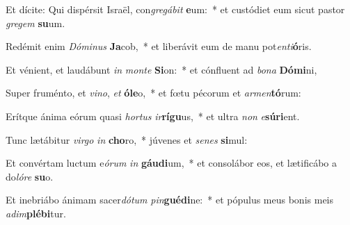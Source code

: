 \item Et dícite: Qui dispérsit Israël, con\textit{gre}\textit{gá}\textit{bit} \textbf{e}um:~* et custódiet eum sicut pastor \textit{gre}\textit{gem} \textbf{su}um.
\item Redémit enim \textit{Dó}\textit{mi}\textit{nus} \textbf{Ja}cob,~* et liberávit eum de manu pot\textit{en}\textit{ti}\textbf{ó}ris.
\item Et vénient, et laudábunt \textit{in} \textit{mon}\textit{te} \textbf{Si}on:~* et cónfluent ad \textit{bo}\textit{na} \textbf{Dó}\textbf{mi}ni,
\item Super fruménto, et \textit{vi}\textit{no}, \textit{et} \textbf{ó}\textbf{le}o,~* et fœtu pécorum et \textit{ar}\textit{men}\textbf{tó}rum:
\item Erítque ánima eórum quasi \textit{hor}\textit{tus} \textit{ir}\textbf{rí}\textbf{gu}us,~* et ultra \textit{non} \textit{e}\textbf{sú}\textbf{ri}ent.
\item Tunc lætábitur \textit{vir}\textit{go} \textit{in} \textbf{cho}ro,~* júvenes et \textit{se}\textit{nes} \textbf{si}mul:
\item Et convértam luctum e\textit{ó}\textit{rum} \textit{in} \textbf{gáu}\textbf{di}um,~* et consolábor eos, et lætificábo a do\textit{ló}\textit{re} \textbf{su}o.
\item Et inebriábo ánimam sacer\textit{dó}\textit{tum} \textit{pin}\textbf{gué}\textbf{di}ne:~* et pópulus meus bonis meis \textit{ad}\textit{im}\textbf{plé}\textbf{bi}tur.
